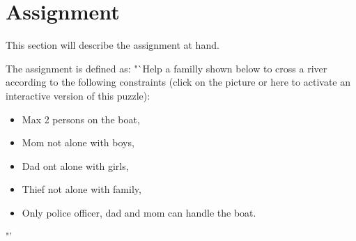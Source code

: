 \section{Assignment}
This section will describe the assignment at hand.

The assignment is defined as:
"`Help a familly shown below to cross a river according to the following constraints (click on the picture or here to activate an interactive version of this puzzle):

\begin{itemize}
	\item Max 2 persons on the boat,
	\item Mom not alone with boys,
	\item Dad ont alone with girls,
	\item Thief not alone with family,
	\item Only police officer, dad and mom can handle the boat.
\end{itemize}
"'

    
    
    
    
    